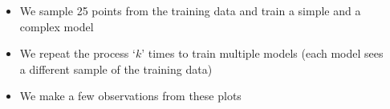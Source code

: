 \begin{frame}
	\begin{columns}
		\begin{column}{0.4\textwidth}
			
			\justifying {}
								
		\end{column}
		\begin{column}{0.6\textwidth}
						
			\begin{itemize}
				\justifying
				\setlength\itemsep{1em}
				\item<1-> We sample 25 points from the training data and train a simple and a complex model
				\item<2-> We repeat the process `$k$' times to train multiple models (each model sees a different sample of the training data)
				\item<3-> We make a few observations from these plots
			\end{itemize}
		\end{column}
	\end{columns}
\end{frame}
